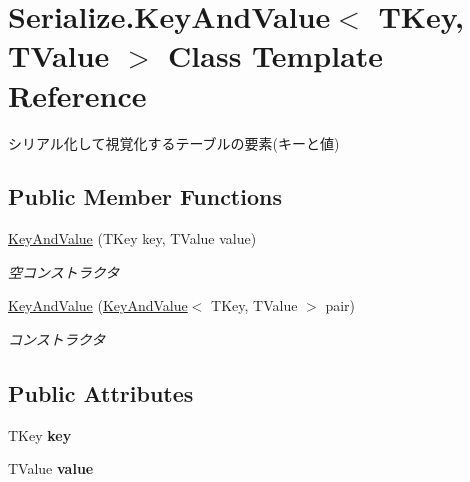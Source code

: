 \hypertarget{class_serialize_1_1_key_and_value}{}\section{Serialize.\+Key\+And\+Value$<$ T\+Key, T\+Value $>$ Class Template Reference}
\label{class_serialize_1_1_key_and_value}


シリアル化して視覚化するテーブルの要素(キーと値)  


\subsection*{Public Member Functions}
\begin{DoxyCompactItemize}
\item 
\hyperlink{class_serialize_1_1_key_and_value_a6455331fc8ad322e913a27a7aefcc1b4}{Key\+And\+Value} (T\+Key key, T\+Value value)
\begin{DoxyCompactList}\small\item\em 空コンストラクタ \end{DoxyCompactList}\item 
\hyperlink{class_serialize_1_1_key_and_value_a4a917a400efd3c0eda67eab00b4a7160}{Key\+And\+Value} (\hyperlink{class_serialize_1_1_key_and_value}{Key\+And\+Value}$<$ T\+Key, T\+Value $>$ pair)
\begin{DoxyCompactList}\small\item\em コンストラクタ \end{DoxyCompactList}\end{DoxyCompactItemize}
\subsection*{Public Attributes}
\begin{DoxyCompactItemize}
\item 
T\+Key {\bfseries key}\hypertarget{class_serialize_1_1_key_and_value_a09070d1ab43775ff20bb3c90b305b360}{}\label{class_serialize_1_1_key_and_value_a09070d1ab43775ff20bb3c90b305b360}

\item 
T\+Value {\bfseries value}\hypertarget{class_serialize_1_1_key_and_value_a64c9a11f4b75cbc6ef8d9c184b9f9813}{}\label{class_serialize_1_1_key_and_value_a64c9a11f4b75cbc6ef8d9c184b9f9813}

\end{DoxyCompactItemize}


